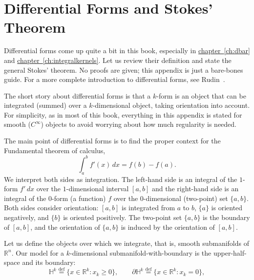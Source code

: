 \documentclass[12pt,openany]{book}
\newcommand{\R}{{\mathbb{R}}}
\newcommand{\bH}{{\mathbb{H}}}
\theoremstyle{plain}
\theoremstyle{remark}
\theoremstyle{definition}
\theoremstyle{exercise}
\theoremstyle{example}
\newcommand{\chapterref}[1]{\hyperref[#1]{chapter~\ref*{#1}}}
\begin{document}

\chapter{Differential Forms and Stokes' Theorem} \label{ap:diffforms}


Differential forms come up quite a bit in this book, especially
in \chapterref{ch:dbar} and \chapterref{ch:integralkernels}.
Let us review their definition
and state the general Stokes' theorem.  No proofs are given; this appendix
is just a bare-bones guide.
For a more complete introduction to differential forms,
see Rudin~\cite{Rudin:principles}.

The short story about differential forms is that a $k$-form is an object
that can be integrated (summed) over a $k$-dimensional object,
taking orientation into account.
For simplicity, as in most of this book,
everything in this appendix is stated for smooth
($C^\infty$) objects to avoid worrying about how much regularity is needed.

The main point of differential forms is to find the proper context for the
Fundamental theorem of calculus,
\begin{equation*}
\int_a^b f'(x) \, dx = f(b)-f(a) .
\end{equation*}
We interpret both sides as integration.  The left-hand side is an integral
of the $1$-form $f'\, dx$ over the $1$-dimensional interval $[a,b]$
and the right-hand side is an integral of the $0$-form (a function)
$f$ over the $0$-dimensional (two-point) set $\{ a, b \}$.  Both sides
consider orientation: $[a,b]$ is integrated from $a$ to $b$,
$\{a\}$ is oriented negatively, and
$\{b\}$ is oriented positively.  The two-point set
$\{a,b\}$ is the boundary of $[a,b]$, and the orientation of $\{ a,b \}$
is induced by the orientation of $[a,b]$.

Let us define the objects over which we integrate, that is,
smooth submanifolds of $\R^n$.
Our model for a $k$-dimensional submanifold-with-boundary
is the upper-half-space and its boundary:
\begin{equation*}
\bH^k
\overset{\text{def}}{=}
\{ x \in \R^k : x_k \geq 0 \} ,
\qquad
\partial \bH^k
\overset{\text{def}}{=}
\{ x \in \R^k : x_k = 0 \} ,
\end{equation*}
\end{document}

